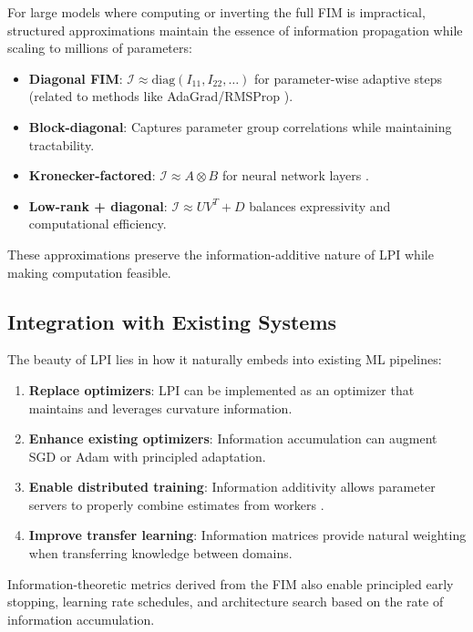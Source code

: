 \documentclass[11pt]{article}
\begin{document}
For large models where computing or inverting the full FIM is impractical, structured approximations \cite{martens2015optimizing} maintain the essence of information propagation while scaling to millions of parameters:

\begin{itemize}
\item \textbf{Diagonal FIM}: $\mathcal{I} \approx \text{diag}(I_{11}, I_{22}, \ldots)$ for parameter-wise adaptive steps (related to methods like AdaGrad/RMSProp \cite{kingma2014adam}).
\item \textbf{Block-diagonal}: Captures parameter group correlations while maintaining tractability.
\item \textbf{Kronecker-factored}: $\mathcal{I} \approx A \otimes B$ for neural network layers \cite{martens2015optimizing}.
\item \textbf{Low-rank + diagonal}: $\mathcal{I} \approx UV^T + D$ balances expressivity and computational efficiency.
\end{itemize}

These approximations preserve the information-additive nature of LPI while making computation feasible.

\subsection{Integration with Existing Systems}
The beauty of LPI lies in how it naturally embeds into existing ML pipelines:

\begin{enumerate}
\item \textbf{Replace optimizers}: LPI can be implemented as an optimizer that maintains and leverages curvature information.
\item \textbf{Enhance existing optimizers}: Information accumulation can augment SGD or Adam \cite{kingma2014adam} with principled adaptation.
\item \textbf{Enable distributed training}: Information additivity allows parameter servers to properly combine estimates from workers \cite{dean2012large}.
\item \textbf{Improve transfer learning}: Information matrices provide natural weighting when transferring knowledge between domains.
\end{enumerate}

Information-theoretic metrics derived from the FIM also enable principled early stopping, learning rate schedules, and architecture search based on the rate of information accumulation.
\end{document}
